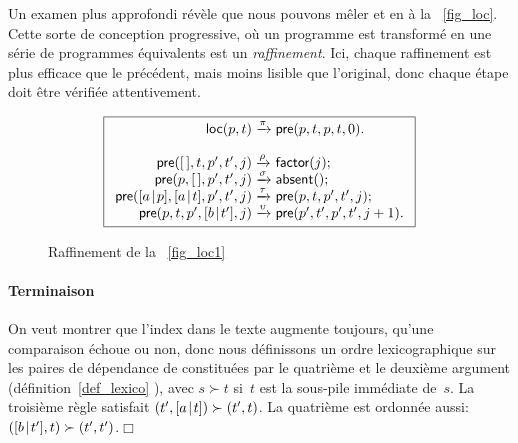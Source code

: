 Un examen plus approfondi révèle que nous pouvons mêler
 et
 en
 à la \fig~\vref{fig_loc}. Cette sorte de
conception progressive, où un programme est transformé en une série de
programmes équivalents est un \emph{raffinement}. Ici, chaque
raffinement est plus efficace que le précédent, mais moins lisible que
l'original, donc chaque étape doit être vérifiée attentivement.
\begin{figure}[h]
\begin{equation*}
\boxed{%
\begin{array}{r@{\;}l@{\;}l}
\fun{loc}(p,t)   & \xrightarrow{\smash{\pi}} & \fun{pre}(p,t,p,t,0).\\
\\
\fun{pre}(\el,t,p',t',j) & \xrightarrow{\smash{\rho}}
                         & \fun{factor}(j);\\
\fun{pre}(p,\el,p',t',j) & \xrightarrow{\smash{\sigma}}
                         & \fun{absent}();\\
\fun{pre}(\cons{a}{p},\cons{a}{t},p',t',j)
                         & \xrightarrow{\smash{\tau}}
                         & \fun{pre}(p,t,p',t',j);\\
\fun{pre}(p,t,p',\cons{b}{t'},j) & \xrightarrow{\smash{\upsilon}}
                         & \fun{pre}(p',t',p',t',j+1).
\end{array}}
\end{equation*}
\caption{Raffinement de la \fig~\vref{fig_loc1}
\label{fig_loc}}
\end{figure}

\paragraph{Terminaison}

On veut montrer que l'index dans le texte augmente toujours, qu'une
comparaison échoue ou non, donc nous définissons un ordre
lexicographique sur les paires de dépendance de 
 constituées par le quatrième
et le deuxième argument (définition~\eqref{def_lexico}
), avec \(s \succ t\) si~\(t\) est la sous-pile
immédiate de~\(s\). La troisième règle satisfait \((t',[{a}\!\mid\!{t}])
\succ (t',t)\). La quatrième est ordonnée aussi: \(([{b}\!\mid\!{t'}],t)
\succ (t',t')\).\hfill\(\Box\)

